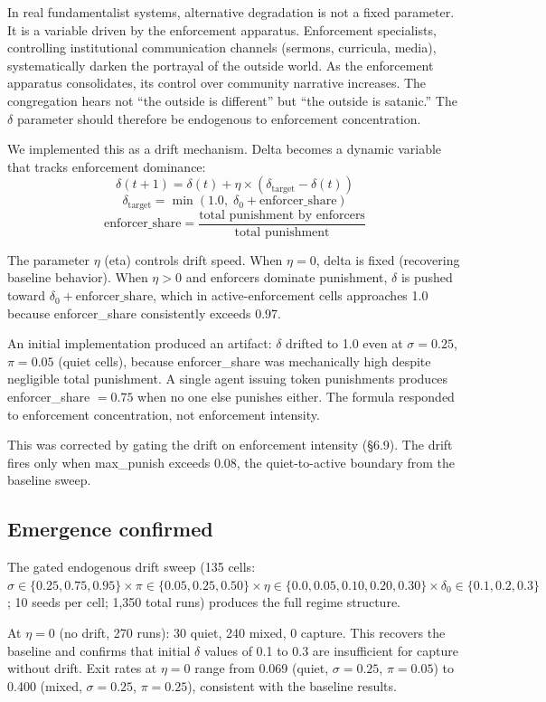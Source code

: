 \documentclass[12pt]{article}
\begin{document}
In real fundamentalist systems, alternative degradation is not a fixed parameter. It is a variable driven by the enforcement apparatus. Enforcement specialists, controlling institutional communication channels (sermons, curricula, media), systematically darken the portrayal of the outside world. As the enforcement apparatus consolidates, its control over community narrative increases. The congregation hears not ``the outside is different'' but ``the outside is satanic.'' The $\delta$ parameter should therefore be endogenous to enforcement concentration.

We implemented this as a drift mechanism. Delta becomes a dynamic variable that tracks enforcement dominance:
\[
\delta(t+1) = \delta(t) + \eta \times (\delta_{\text{target}} - \delta(t))
\]
\[
\delta_{\text{target}} = \min(1.0,\; \delta_0 + \text{enforcer\_share})
\]
\[
\text{enforcer\_share} = \frac{\text{total punishment by enforcers}}{\text{total punishment}}
\]

The parameter $\eta$ (eta) controls drift speed. When $\eta = 0$, delta is fixed (recovering baseline behavior). When $\eta > 0$ and enforcers dominate punishment, $\delta$ is pushed toward $\delta_0 + \text{enforcer\_share}$, which in active-enforcement cells approaches 1.0 because enforcer\_share consistently exceeds 0.97.

An initial implementation produced an artifact: $\delta$ drifted to 1.0 even at $\sigma = 0.25$, $\pi = 0.05$ (quiet cells), because enforcer\_share was mechanically high despite negligible total punishment. A single agent issuing token punishments produces enforcer\_share $= 0.75$ when no one else punishes either. The formula responded to enforcement concentration, not enforcement intensity.

This was corrected by gating the drift on enforcement intensity (\S6.9). The drift fires only when max\_punish exceeds 0.08, the quiet-to-active boundary from the baseline sweep.

\subsection{Emergence confirmed}

The gated endogenous drift sweep (135 cells: $\sigma \in \{0.25, 0.75, 0.95\} \times \pi \in \{0.05, 0.25, 0.50\} \times \eta \in \{0.0, 0.05, 0.10, 0.20, 0.30\} \times \delta_0 \in \{0.1, 0.2, 0.3\}$; 10 seeds per cell; 1,350 total runs) produces the full regime structure.

At $\eta = 0$ (no drift, 270 runs): 30 quiet, 240 mixed, 0 capture. This recovers the baseline and confirms that initial $\delta$ values of 0.1 to 0.3 are insufficient for capture without drift. Exit rates at $\eta = 0$ range from 0.069 (quiet, $\sigma = 0.25$, $\pi = 0.05$) to 0.400 (mixed, $\sigma = 0.25$, $\pi = 0.25$), consistent with the baseline results.
\end{document}
